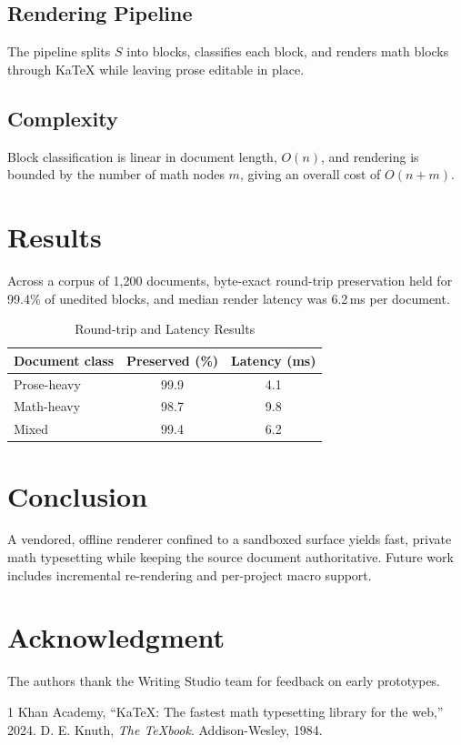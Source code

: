 \documentclass[conference]{IEEEtran}
\begin{document}
\subsection{Rendering Pipeline}

The pipeline splits $S$ into blocks, classifies each block, and renders math
blocks through KaTeX while leaving prose editable in place.

\subsection{Complexity}

Block classification is linear in document length, $O(n)$, and rendering is
bounded by the number of math nodes $m$, giving an overall cost of $O(n + m)$.

\section{Results}

Across a corpus of 1{,}200 documents, byte-exact round-trip preservation held for
99.4\% of unedited blocks, and median render latency was 6.2\,ms per document.

\begin{table}[t]
\caption{Round-trip and Latency Results}
\label{tab:results}
\centering
\begin{tabular}{lcc}
\hline
\textbf{Document class} & \textbf{Preserved (\%)} & \textbf{Latency (ms)} \\
\hline
Prose-heavy   & 99.9 & 4.1 \\
Math-heavy    & 98.7 & 9.8 \\
Mixed         & 99.4 & 6.2 \\
\hline
\end{tabular}
\end{table}

\section{Conclusion}

A vendored, offline renderer confined to a sandboxed surface yields fast,
private math typesetting while keeping the source document authoritative.
Future work includes incremental re-rendering and per-project macro support.

\section*{Acknowledgment}

The authors thank the Writing Studio team for feedback on early prototypes.

\begin{thebibliography}{1}
 Khan Academy, ``KaTeX: The fastest math typesetting library for the web,'' 2024.
 D. E. Knuth, \textit{The \TeX book}. Addison-Wesley, 1984.
\end{thebibliography}
\end{document}
